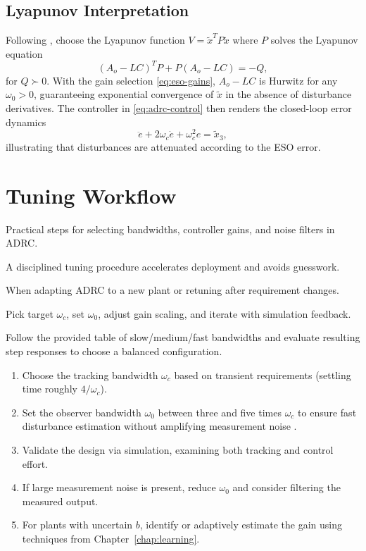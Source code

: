 \subsection{Lyapunov Interpretation}
Following \textcite{han2009auto}, choose the Lyapunov function $V = \tilde{x}^T P \tilde{x}$ where $P$ solves the Lyapunov equation
\begin{equation}
    (A_o - L C)^T P + P (A_o - L C) = -Q,
\end{equation}
for $Q \succ 0$. With the gain selection \eqref{eq:eso-gains}, $A_o - L C$ is Hurwitz for any $\omega_0 > 0$, guaranteeing exponential convergence of $\tilde{x}$ in the absence of disturbance derivatives. The controller in \eqref{eq:adrc-control} then renders the closed-loop error dynamics
\begin{equation}
    \ddot{e} + 2 \omega_c \dot{e} + \omega_c^2 e = \tilde{x}_3,
\end{equation}
illustrating that disturbances are attenuated according to the ESO error.

\section{Tuning Workflow}
\begin{beginnerguide}
    \item[\textbf{What?}] Practical steps for selecting bandwidths, controller gains, and noise filters in ADRC.
    \item[\textbf{Why?}] A disciplined tuning procedure accelerates deployment and avoids guesswork.
    \item[\textbf{When?}] When adapting ADRC to a new plant or retuning after requirement changes.
    \item[\textbf{How?}] Pick target $\omega_c$, set $\omega_0$, adjust gain scaling, and iterate with simulation feedback.
    \item[\textbf{Example}] Follow the provided table of slow/medium/fast bandwidths and evaluate resulting step responses to choose a balanced configuration.
\end{beginnerguide}
\begin{enumerate}[leftmargin=*]
    \item Choose the tracking bandwidth $\omega_c$ based on transient requirements (settling time roughly $4/\omega_c$).
    \item Set the observer bandwidth $\omega_0$ between three and five times $\omega_c$ to ensure fast disturbance estimation without amplifying measurement noise \parencite{gao2006active}.
    \item Validate the design via simulation, examining both tracking and control effort.
    \item If large measurement noise is present, reduce $\omega_0$ and consider filtering the measured output.
    \item For plants with uncertain $b$, identify or adaptively estimate the gain using techniques from Chapter~\ref{chap:learning}.
\end{enumerate}

